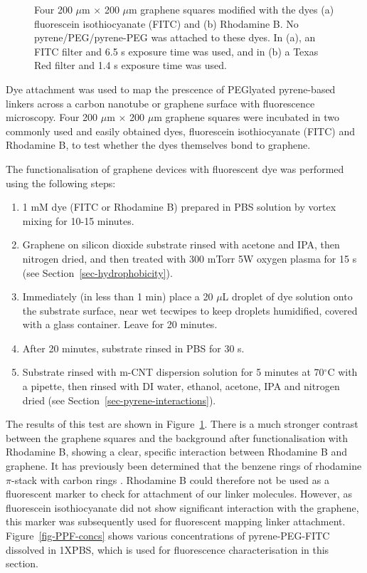 \documentclass[
  a4paper,
]{scrbook}
\begin{document}
\begin{figure}
\begin{minipage}[t]{0.47\linewidth}
{{}

}

\subcaption{\label{fig-rhodamine}}
\end{minipage}%

\caption{\label{fig-FITC-rhodamine-B}Four 200 \(\mu\)m \(\times\) 200
\(\mu\)m graphene squares modified with the dyes (a) fluorescein
isothiocyanate (FITC) and (b) Rhodamine B. No pyrene/PEG/pyrene-PEG was
attached to these dyes. In (a), an FITC filter and 6.5 s exposure time
was used, and in (b) a Texas Red filter and 1.4 s exposure time was
used.}

\end{figure}

Dye attachment was used to map the prescence of PEGlyated pyrene-based
linkers across a carbon nanotube or graphene surface with fluorescence
microscopy. Four 200 \(\mu\)m \(\times\) 200 \(\mu\)m graphene squares
were incubated in two commonly used and easily obtained dyes,
fluorescein isothiocyanate (FITC) and Rhodamine B, to test whether the
dyes themselves bond to graphene.

The functionalisation of graphene devices with fluorescent dye was
performed using the following steps:

\begin{enumerate}
\def\labelenumi{\arabic{enumi}.}
\item
  1 mM dye (FITC or Rhodamine B) prepared in PBS solution by vortex
  mixing for 10-15 minutes.
\item
  Graphene on silicon dioxide substrate rinsed with acetone and IPA,
  then nitrogen dried, and then treated with 300 mTorr 5W oxygen plasma
  for 15 s (see Section~\ref{sec-hydrophobicity}).
\item
  Immediately (in less than 1 min) place a 20 \(\mu\)L droplet of dye
  solution onto the substrate surface, near wet tecwipes to keep
  droplets humidified, covered with a glass container. Leave for 20
  minutes.
\item
  After 20 minutes, substrate rinsed in PBS for 30 s.
\item
  Substrate rinsed with m-CNT dispersion solution for 5 minutes at
  70\(^\circ\)C with a pipette, then rinsed with DI water, ethanol,
  acetone, IPA and nitrogen dried (see
  Section~\ref{sec-pyrene-interactions}).
\end{enumerate}

The results of this test are shown in Figure~\ref{fig-FITC-rhodamine-B}.
There is a much stronger contrast between the graphene squares and the
background after functionalisation with Rhodamine B, showing a clear,
specific interaction between Rhodamine B and graphene. It has previously
been determined that the benzene rings of rhodamine \(\pi\)-stack with
carbon rings \autocite{Tang2012}. Rhodamine B could therefore not be
used as a fluorescent marker to check for attachment of our linker
molecules. However, as fluorescein isothiocyanate did not show
significant interaction with the graphene, this marker was subsequently
used for fluorescent mapping linker attachment.
Figure~\ref{fig-PPF-concs} shows various concentrations of
pyrene-PEG-FITC dissolved in 1XPBS, which is used for fluorescence
characterisation in this section.
\end{document}
